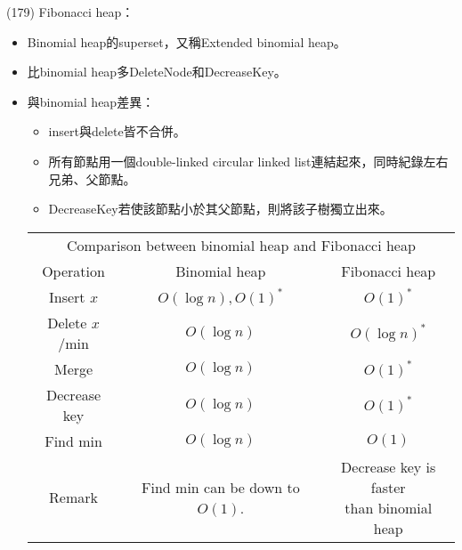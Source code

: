 \item \begin{theorem}{(179)} Fibonacci heap： \label{fibheap}\begin{itemize}
        \item Binomial heap的superset，又稱Extended binomial heap。
        \item 比binomial heap多DeleteNode和DecreaseKey。
        \item 與binomial heap差異：\begin{itemize}
            \item insert與delete皆不合併。
            \item 所有節點用一個double-linked circular linked list連結起來，同時紀錄左右兄弟、父節點。
            \item DecreaseKey若使該節點小於其父節點，則將該子樹獨立出來。
        \end{itemize}
        \begin{table}[H]
            \centering
            \begin{tabular}{|c|c|c|}
                \hline
                \multicolumn{3}{|c|}{Comparison between binomial heap and Fibonacci heap} \\
                \Xhline{3\arrayrulewidth}
                Operation & Binomial heap & Fibonacci heap \\
                \Xhline{2\arrayrulewidth}
                Insert $x$ & $O(\log n), O(1)^*$ & $O(1)^*$ \\
                \hline
                Delete $x$/min & $O(\log n)$ & $O(\log n)^*$ \\
                \hline
                Merge & $O(\log n)$ & $O(1)^*$ \\
                \hline
                Decrease key & $O(\log n)$ & $O(1)^*$ \\
                \hline
                Find min & $O(\log n)$ & $O(1)$ \\
                \hline
                Remark & \makecell{Find min can be\\down to $O(1)$.} & \makecell{Decrease key is faster\\than binomial heap} \\
                \hline
            \end{tabular}
        \end{table}
    \end{itemize}
\end{theorem}
